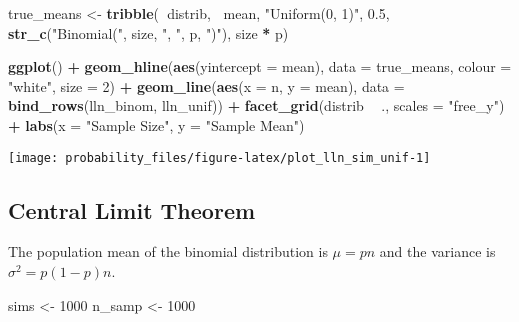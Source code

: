 \documentclass[]{book}
\newenvironment{Shaded}{\begin{snugshade}}{\end{snugshade}}
\newcommand{\KeywordTok}[1]{\textcolor[rgb]{0.13,0.29,0.53}{\textbf{#1}}}
\newcommand{\DataTypeTok}[1]{\textcolor[rgb]{0.13,0.29,0.53}{#1}}
\newcommand{\DecValTok}[1]{\textcolor[rgb]{0.00,0.00,0.81}{#1}}
\newcommand{\FloatTok}[1]{\textcolor[rgb]{0.00,0.00,0.81}{#1}}
\newcommand{\StringTok}[1]{\textcolor[rgb]{0.31,0.60,0.02}{#1}}
\newcommand{\OperatorTok}[1]{\textcolor[rgb]{0.81,0.36,0.00}{\textbf{#1}}}
\newcommand{\NormalTok}[1]{#1}
\theoremstyle{definition}
\theoremstyle{definition}
\theoremstyle{definition}
\theoremstyle{remark}
\begin{document}
\begin{Shaded}
\begin{Highlighting}[]
\NormalTok{true_means <-}
\StringTok{  }\KeywordTok{tribble}\NormalTok{(}\OperatorTok{~}\NormalTok{distrib, }\OperatorTok{~}\NormalTok{mean,}
          \StringTok{"Uniform(0, 1)"}\NormalTok{, }\FloatTok{0.5}\NormalTok{,}
          \KeywordTok{str_c}\NormalTok{(}\StringTok{"Binomial("}\NormalTok{, size, }\StringTok{", "}\NormalTok{, p, }\StringTok{")"}\NormalTok{), size }\OperatorTok{*}\StringTok{ }\NormalTok{p)}

\KeywordTok{ggplot}\NormalTok{() }\OperatorTok{+}
\StringTok{  }\KeywordTok{geom_hline}\NormalTok{(}\KeywordTok{aes}\NormalTok{(}\DataTypeTok{yintercept =}\NormalTok{ mean), }\DataTypeTok{data =}\NormalTok{ true_means,}
             \DataTypeTok{colour =} \StringTok{"white"}\NormalTok{, }\DataTypeTok{size =} \DecValTok{2}\NormalTok{) }\OperatorTok{+}
\StringTok{  }\KeywordTok{geom_line}\NormalTok{(}\KeywordTok{aes}\NormalTok{(}\DataTypeTok{x =}\NormalTok{ n, }\DataTypeTok{y =}\NormalTok{ mean),}
            \DataTypeTok{data =} \KeywordTok{bind_rows}\NormalTok{(lln_binom, lln_unif)) }\OperatorTok{+}
\StringTok{  }\KeywordTok{facet_grid}\NormalTok{(distrib }\OperatorTok{~}\StringTok{ }\NormalTok{., }\DataTypeTok{scales =} \StringTok{"free_y"}\NormalTok{) }\OperatorTok{+}
\StringTok{  }\KeywordTok{labs}\NormalTok{(}\DataTypeTok{x =} \StringTok{"Sample Size"}\NormalTok{, }\DataTypeTok{y =} \StringTok{"Sample Mean"}\NormalTok{)}
\end{Highlighting}
\end{Shaded}

\begin{center}\texttt{[image: probability\_files/figure-latex/plot\_lln\_sim\_unif-1]} \end{center}

\subsection{Central Limit Theorem}\label{central-limit-theorem}

The population mean of the binomial distribution is \(\mu = p n\) and
the variance is \(\sigma^2 = p (1 - p) n\).

\begin{Shaded}
\begin{Highlighting}[]
\NormalTok{sims <-}\StringTok{ }\DecValTok{1000}
\NormalTok{n_samp <-}\StringTok{ }\DecValTok{1000}
\end{Highlighting}
\end{Shaded}
\end{document}

